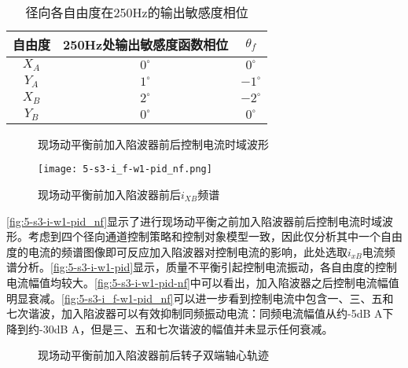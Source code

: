 \documentclass[
  lang=cn,
  degree=master,
  openany,oneside
]{nuaathesis}
\begin{document}
\begin{table}[h!]
  \caption[径向各自由度在250Hz的输出敏感度相位]{径向各自由度在250Hz的输出敏感度相位\label{tab:250_S0_phase}}
  \begin{tabular}{ccc}
    \toprule
    自由度 & 250Hz处输出敏感度函数相位 & $\theta _f$ \\
    \midrule
    $X_A$ & $0^{\circ}$ & $0^{\circ}$\\
    $Y_A$ & $1^{\circ}$ & $-1^{\circ}$\\
    $X_B$ & $2^{\circ}$ & $-2^{\circ}$\\
    $Y_B$ & $0^{\circ}$ & $0^{\circ}$\\
    \bottomrule
  \end{tabular}
\end{table}

\begin{figure}[h!]  
	\quad  
	\caption{现场动平衡前加入陷波器前后控制电流时域波形}  \label{fig:5-s3-i-w1-pid_nf}\end{figure}
	
\begin{figure}[h!]
	\texttt{[image: 5-s3-i\_f-w1-pid\_nf.png]}
	\caption{现场动平衡前加入陷波器前后$i_{XB}$频谱}
	\label{fig:5-s3-i_f-w1-pid_nf}
\end{figure}

\autoref{fig:5-s3-i-w1-pid_nf}显示了进行现场动平衡之前加入陷波器前后控制电流时域波形。考虑到四个径向通道控制策略和控制对象模型一致，因此仅分析其中一个自由度的电流的频谱图像即可反应加入陷波器对控制电流的影响，此处选取$i_{xB}$电流频谱分析。\autoref{fig:5-s3-i-w1-pid}显示，质量不平衡引起控制电流振动，各自由度的控制电流幅值均较大。\autoref{fig:5-s3-i-w1-pid-nf}中可以看出，加入陷波器之后控制电流幅值明显衰减。\autoref{fig:5-s3-i_f-w1-pid_nf}可以进一步看到控制电流中包含一、三、五和七次谐波，加入陷波器可以有效抑制同频振动电流：同频电流幅值从约-5dB A下降到约-30dB A，但是三、五和七次谐波的幅值并未显示任何衰减。

\begin{figure}[h!]  
	\quad  
	\caption{现场动平衡前加入陷波器前后转子双端轴心轨迹}  
	\label{fig:5-s3-x_locus-w1-pid-nf_end}
\end{figure}
\end{document}
